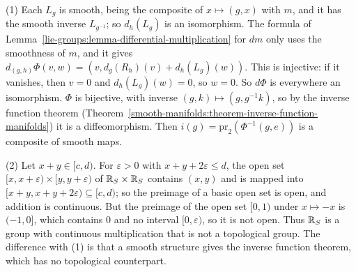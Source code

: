 \begin{solution}
(1) Each $L_g$ is smooth, being the composite of $x \mapsto (g, x)$ with $m$, and it has the smooth inverse $L_{g^{-1}}$; so $d_h(L_g)$ is an isomorphism. The formula of
Lemma~\ref{lie-groups:lemma-differential-multiplication} for $dm$ only uses the smoothness of $m$, and it gives $d_{(g, h)}\Phi(v, w) = (v, d_g(R_h)(v) + d_h(L_g)(w))$. This is injective:
if it vanishes, then $v = 0$ and $d_h(L_g)(w) = 0$, so $w = 0$. So $d\Phi$ is everywhere an isomorphism. $\Phi$ is bijective, with inverse $(g, k) \mapsto (g, g^{-1}k)$, so by the inverse
function theorem (Theorem~\ref{smooth-manifolds:theorem-inverse-function-manifolds}) it is a diffeomorphism. Then $i(g) = \mathrm{pr}_2(\Phi^{-1}(g, e))$ is a composite of smooth maps.

(2) Let $x + y \in [c, d)$. For $\varepsilon > 0$ with $x + y + 2\varepsilon \leq d$, the open set $[x, x + \varepsilon) \times [y, y + \varepsilon)$ of $\mathbb{R}_S \times \mathbb{R}_S$ contains $(x, y)$ and
is mapped into $[x + y, x + y + 2\varepsilon) \subseteq [c, d)$; so the preimage of a basic open set is open, and addition is continuous. But the preimage of the open set $[0, 1)$ under
$x \mapsto -x$ is $(-1, 0]$, which contains $0$ and no interval $[0, \varepsilon)$, so it is not open. Thus $\mathbb{R}_S$ is a group with continuous multiplication that is not a topological group. The
difference with (1) is that a smooth structure gives the inverse function theorem, which has no topological counterpart.
\end{solution}
